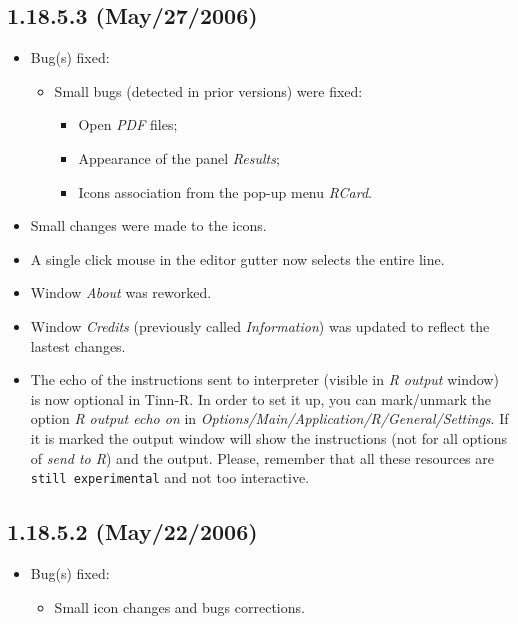 \subsection*{1.18.5.3 (May/27/2006)}
\begin{itemize}
  \item Bug(s) fixed:
    \begin{itemize}
      \item Small bugs (detected in prior versions) were fixed:
        \begin{itemize}
          \item Open \textit{PDF} files;
          \item Appearance of the panel \textit{Results};
          \item Icons association from the pop-up menu \textit{RCard}.
        \end{itemize}
    \end{itemize}
  \item Small changes were made to the icons.
  \item A single click mouse in the editor gutter now selects the
    entire line.
  \item Window \textit{About} was reworked.
  \item Window \textit{Credits} (previously called \textit{Information})
    was updated to reflect the lastest changes.
  \item The echo of the instructions sent to \RR{} interpreter
    (visible in \textit{R output} window) is now optional in Tinn-R.
    In order to set it up, you can mark/unmark the option
    \textit{R output echo on} in \textit{Options/Main/Application/R/General/Settings}.
    If it is marked the \RR{} output window will show the instructions
    (not for all options of \textit{send to R}) and the \RR{} output.
    Please, remember that all these resources are \texttt{still experimental}
    and not too interactive.
\end{itemize}


\subsection*{1.18.5.2 (May/22/2006)}
\begin{itemize}
  \item Bug(s) fixed:
    \begin{itemize}
      \item Small icon changes and bugs corrections.
    \end{itemize}
\end{itemize}


